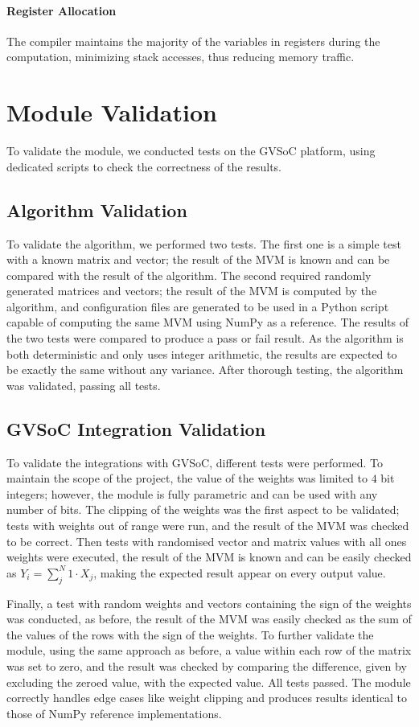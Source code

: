 \paragraph{Register Allocation} The compiler maintains the majority of the variables in registers during the computation, minimizing stack accesses, thus reducing memory traffic.


\section{Module Validation}\label{sec:mod_val}
To validate the module, we conducted tests on the GVSoC platform, using dedicated scripts to check the correctness of the results.

\subsection{Algorithm Validation}\label{sec:alg_val}
To validate the algorithm, we performed two tests.
The first one is a simple test with a known matrix and vector; the result of the MVM is known and can be compared with the result of the algorithm.
The second required randomly generated matrices and vectors; the result of the MVM is computed by the algorithm, and configuration files are generated to be used in a Python script capable of computing the same MVM using NumPy as a reference.
The results of the two tests were compared to produce a pass or fail result.
As the algorithm is both deterministic and only uses integer arithmetic, the results are expected to be exactly the same without any variance.
After thorough testing, the algorithm was validated, passing all tests.

\subsection{GVSoC Integration Validation}\label{sec:gvsoc_val}
To validate the integrations with GVSoC, different tests were performed.
To maintain the scope of the project, the value of the weights was limited to $4$ bit integers; however, the module is fully parametric and can be used with any number of bits.
The clipping of the weights was the first aspect to be validated; tests with weights out of range were run, and the result of the MVM was checked to be correct.
Then tests with randomised vector and matrix values with all ones weights were executed, the result of the MVM is known and can be easily checked as $Y_i=\sum_{j}^{N}1\cdot X_j$, making the expected result appear on every output value.

Finally, a test with random weights and vectors containing the sign of the weights was conducted, as before, the result of the MVM was easily checked as the sum of the values of the rows with the sign of the weights.
To further validate the module, using the same approach as before, a value within each row of the matrix was set to zero, and the result was checked by comparing the difference, given by excluding the zeroed value, with the expected value.
All tests passed. The module correctly handles edge cases like weight clipping and produces results identical to those of NumPy reference implementations.

